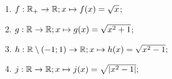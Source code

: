 \begin{enumerate}
	\item $f:\mathbb{R}_+\rightarrow\mathbb{R};x\mapsto f(x)=\sqrt{x}$;
	\item $g:\mathbb{R}\rightarrow\mathbb{R};x\mapsto g(x)=\sqrt{x^2+1}$;
	\item $h:\mathbb{R}\setminus(-1;1)\rightarrow\mathbb{R};x\mapsto h(x)=\sqrt{x^2-1};$
	\item $j:\mathbb{R}\rightarrow\mathbb{R};x\mapsto j(x)=\sqrt{|x^2-1|};$
\end{enumerate}
